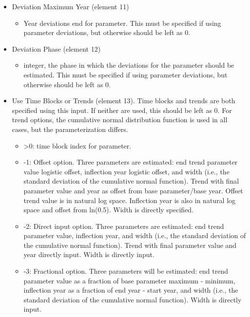\begin{itemize}
\item Deviation  Maximum Year (element 11)
	\begin{itemize}
		\item Year deviations end for parameter. This must be specified if using parameter deviations, but otherwise should be left as 0.
	\end{itemize}
	
\item Deviation Phase (element 12)
	\begin{itemize}
		\item integer, the phase in which the deviations for the parameter should be estimated. This must be specified if using parameter deviations, but otherwise should be left as 0.
	\end{itemize}
	
\item Use Time Blocks or Trends (element 13). Time blocks and trends are both specified using this input. If neither are used, this should be left as 0. For trend options, the cumulative normal distribution function is used in all cases, but the parameterization differs.
	\begin{itemize}
		\item >0: time block index for parameter.
		\item -1: Offset option. Three parameters are estimated: end trend parameter value logistic offset, inflection year logistic offset, and width (i.e., the standard deviation of the cumulative normal function). Trend with final parameter value and year as offset from base parameter/base year. Offset trend value is in natural log space. Inflection year is also in natural log space and offset from ln(0.5). Width is directly specified.
		\item -2: Direct input option. Three parameters are estimated: end trend parameter value, inflection year, and width (i.e., the standard deviation of the cumulative normal function). Trend with final parameter value and year directly input. Width is directly input.
		\item -3: Fractional option. Three parameters will be estimated: end trend parameter value as a fraction of base parameter maximum - minimum, inflection year as a fraction of end year - start year, and width (i.e., the standard deviation of the cumulative normal function). Width is directly input.
	\end{itemize}
	

\end{itemize}
